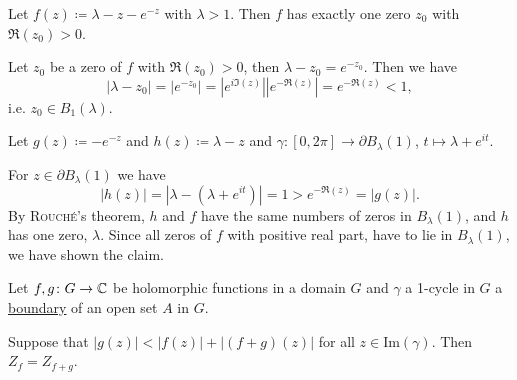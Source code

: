 \documentclass[a4paper,english]{article}
\begin{document}
\begin{example}
    Let $f(z) \coloneqq \lambda - z - e^{-z}$ with $\lambda > 1$.
    Then $f$ has exactly one zero $z_0$ with $\Re(z_0) > 0$.
    
    Let $z_0$ be a zero of $f$ with $\Re(z_0) > 0$, then $\lambda - z_0 = e^{- z_0}$.
    Then we have
    \begin{equation*}
        | \lambda - z_0 |
        = | e^{- z_0} |
        = | e^{i \Im(z)} | | e^{-\Re(z)} |
        = e^{-\Re(z)}
        < 1,
    \end{equation*}
    i.e. $z_0 \in B_{1}(\lambda)$.
    
    Let $g(z) \coloneqq - e^{- z}$ and $h(z) \coloneqq \lambda - z$ and $\gamma \colon [0, 2 \pi] \to \partial B_{\lambda}(1)$, $t \mapsto \lambda + e^{i t}$.
    
    For $z \in \partial B_{\lambda}(1)$ we have
    \begin{equation*}
        | h(z) |
        = | \lambda - (\lambda + e^{i t}) |
        = 1
        > e^{- \Re(z)}
        = | g(z) |.
    \end{equation*}
    By \textsc{Rouché}'s theorem, $h$ and $f$ have the same numbers of zeros in $B_{\lambda}(1)$, and $h$ has one zero, $\lambda$.
    Since all zeros of $f$ with positive real part, have to lie in $B_{\lambda}(1)$, we have shown the claim.
\end{example}

\begin{cor}
    Let $f, g \colon G \to \operatorname{\mathbb{C}}$ be holomorphic functions in a domain $G$ and $\gamma$ a 1-cycle in $G$ a \hyperref[defn:boundary]{boundary} of an open set $A$ in $G$.
    
    Suppose that $| g(z) | < | f(z) | + | (f + g)(z) |$ for all $z \in \text{Im}(\gamma)$.
    Then $Z_{f} = Z_{f + g}$.
\end{cor}
\end{document}
